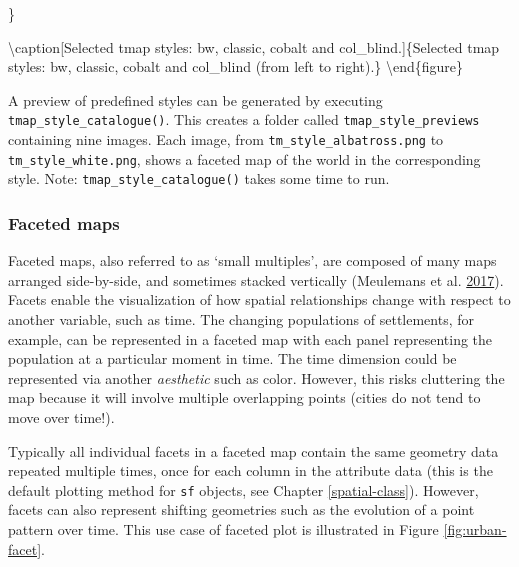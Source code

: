 \documentclass[]{krantz}
\let\BeginKnitrBlock\begin \let\EndKnitrBlock\end
\begin{document}
\}

\textbackslash{}caption{[}Selected tmap styles: bw, classic, cobalt and col\_blind.{]}\{Selected tmap styles: bw, classic, cobalt and col\_blind (from left to right).\}\label{fig:tmstyles}
\textbackslash{}end\{figure\}

\BeginKnitrBlock{rmdnote}
A preview of predefined styles can be generated by executing \texttt{tmap\_style\_catalogue()}.
This creates a folder called \texttt{tmap\_style\_previews} containing nine images.
Each image, from \texttt{tm\_style\_albatross.png} to \texttt{tm\_style\_white.png}, shows a faceted map of the world in the corresponding style.
Note: \texttt{tmap\_style\_catalogue()} takes some time to run.
\EndKnitrBlock{rmdnote}

\hypertarget{faceted-maps}{%
\subsubsection{Faceted maps}\label{faceted-maps}}

Faceted maps, also referred to as `small multiples', are composed of many maps arranged side-by-side, and sometimes stacked vertically (Meulemans et al. \protect\hyperlink{ref-meulemans_small_2017}{2017}).
Facets enable the visualization of how spatial relationships change with respect to another variable, such as time.
The changing populations of settlements, for example, can be represented in a faceted map with each panel representing the population at a particular moment in time.
The time dimension could be represented via another \emph{aesthetic} such as color.
However, this risks cluttering the map because it will involve multiple overlapping points (cities do not tend to move over time!).

Typically all individual facets in a faceted map contain the same geometry data repeated multiple times, once for each column in the attribute data (this is the default plotting method for \texttt{sf} objects, see Chapter \ref{spatial-class}).
However, facets can also represent shifting geometries such as the evolution of a point pattern over time.
This use case of faceted plot is illustrated in Figure \ref{fig:urban-facet}.
\end{document}
